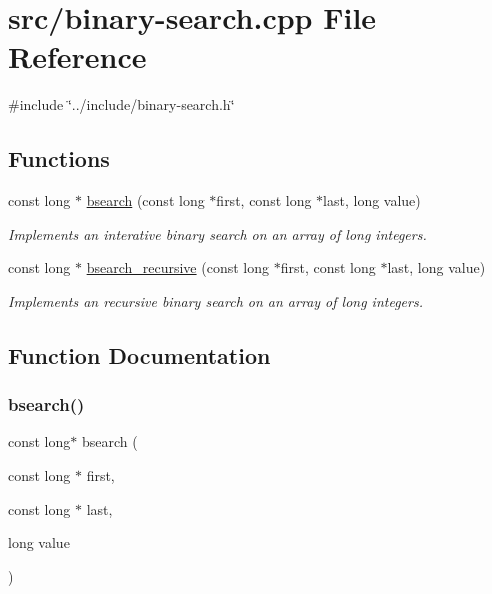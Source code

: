 \hypertarget{binary-search_8cpp}{}\section{src/binary-\/search.cpp File Reference}
\label{binary-search_8cpp}
{\ttfamily \#include \char`\"{}../include/binary-\/search.\+h\char`\"{}}\newline
\subsection*{Functions}
\begin{DoxyCompactItemize}
\item 
const long $\ast$ \mbox{\hyperlink{binary-search_8cpp_a20826c3f30778820b4c09cc75c30bfab}{bsearch}} (const long $\ast$first, const long $\ast$last, long value)
\begin{DoxyCompactList}\small\item\em Implements an interative binary search on an array of long integers. \end{DoxyCompactList}\item 
const long $\ast$ \mbox{\hyperlink{binary-search_8cpp_a9d68880223de2f3819bffee36f8486a5}{bsearch\+\_\+recursive}} (const long $\ast$first, const long $\ast$last, long value)
\begin{DoxyCompactList}\small\item\em Implements an recursive binary search on an array of long integers. \end{DoxyCompactList}\end{DoxyCompactItemize}


\subsection{Function Documentation}
\mbox{\label{binary-search_8cpp_a20826c3f30778820b4c09cc75c30bfab}} 
\subsubsection{\texorpdfstring{bsearch()}{bsearch()}}
{\footnotesize\ttfamily const long$\ast$ bsearch (\begin{DoxyParamCaption}\item[{const long $\ast$}]{first,  }\item[{const long $\ast$}]{last,  }\item[{long}]{value }\end{DoxyParamCaption})}



